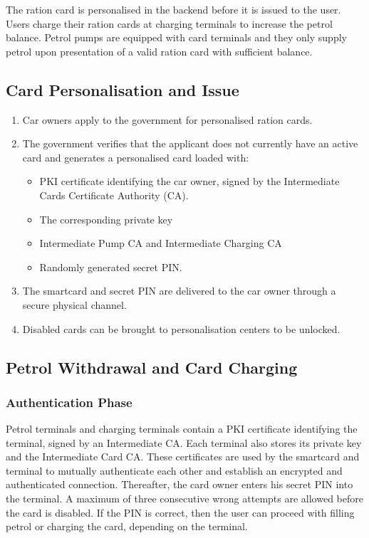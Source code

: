 The ration card is personalised in the backend before it is issued to the user. Users charge their ration cards at charging terminals to increase the petrol balance. Petrol pumps are equipped with card terminals and they only supply petrol upon presentation of a valid ration card with sufficient balance.

\subsection{Card Personalisation and Issue}

\begin{enumerate}
  \item Car owners apply to the government for personalised ration cards.
  \item The government verifies that the applicant does not currently have an active card and generates a personalised card loaded with: 
	\begin{itemize}
	  \item PKI certificate identifying the car owner, signed by the Intermediate Cards Certificate Authority (CA).
	  \item The corresponding private key
	  \item Intermediate Pump CA and Intermediate Charging CA
	  \item Randomly generated secret PIN.
	\end{itemize}
  \item The smartcard and secret PIN are delivered to the car owner through a secure physical channel.
  \item Disabled cards can be brought to personalisation centers to be unlocked.
\end{enumerate}

\subsection{Petrol Withdrawal and Card Charging}
\subsubsection{Authentication Phase}
Petrol terminals and charging terminals contain a PKI certificate identifying the terminal, signed by an Intermediate CA. Each terminal also stores its private key and the Intermediate Card CA. These certificates are used by the smartcard and terminal to mutually authenticate each other and establish an encrypted and authenticated connection. Thereafter, the card owner enters his secret PIN into the terminal. A maximum of three consecutive wrong attempts are allowed before the card is disabled. If the PIN is correct, then the user can proceed with filling petrol or charging the card, depending on the terminal.

